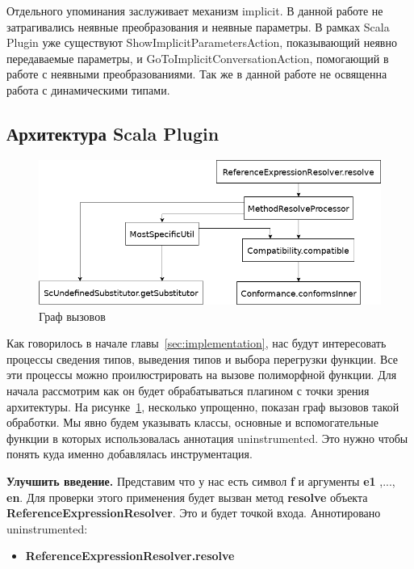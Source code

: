 Отдельного упоминания заслуживает механизм implicit.
В данной работе не затрагивались неявные преобразования и неявные параметры.
В рамках Scala Plugin уже существуют ShowImplicitParametersAction, показывающий
неявно передаваемые параметры, и GoToImplicitConversationAction, помогающий
в работе с неявными преобразованиями.
Так же в данной работе не освященна работа с динамическими типами.

\subsection{Архитектура Scala Plugin}
\label{sec:arch}

\begin{figure}[t]
\centering
\includegraphics[width=\textwidth]{img/call-graph}
\caption{Граф вызовов}
\label{fig:callGraph}
\end{figure}

Как говорилось в начале главы~\ref{sec:implementation}, нас будут интересовать
процессы сведения типов, выведения типов и выбора перегрузки функции.
Все эти процессы можно проилюстрировать на вызове полиморфной функции.
Для начала рассмотрим как он будет обрабатываться плагином с
точки зрения архитектуры.
На рисунке~\ref{fig:callGraph}, несколько упрощенно, показан граф вызовов
такой обработки.
Мы явно будем указывать классы, основные и вспомогательные функции в которых
использовалась аннотация uninstrumented.
Это нужно чтобы понять куда именно добавлялась инструментация.

\textbf{Улучшить введение.}
Представим что у нас есть символ \textbf{f} и аргументы
\textbf{e1} ,..., \textbf{en}.
Для проверки этого применения будет вызван метод \textbf{resolve} объекта
\textbf{ReferenceExpressionResolver}.
Это и будет точкой входа.
Аннотировано uninstrumented:
\begin{itemize}
  \item \textbf{ReferenceExpressionResolver.resolve}
\end{itemize}

